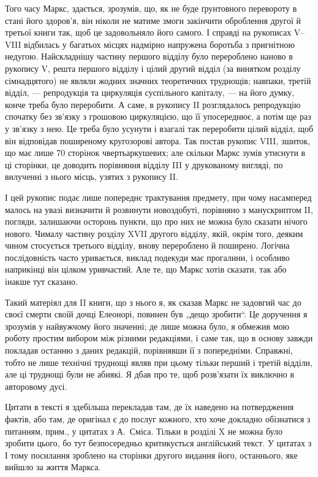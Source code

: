 Того часу Маркс, здається, зрозумів, що, як не буде ґрунтовного перевороту
в стані його здоров’я, він ніколи не матиме змоги закінчити оброблення
другої й третьої книги так, щоб це задовольняло його самого. І справді
на рукописах V--VIII відбилась у багатьох місцях надмірно напружена
боротьба з пригнітною недугою. Найскладнішу частину першого відділу
було перероблено наново в рукопису V, решта першого відділу і цілий
другий відділ (за винятком розділу сімнадцятого) не являли жодних
значних теоретичних труднощів; навпаки, третій відділ, — репродукція
та циркуляція суспільного капіталу, — на його думку, конче треба
було переробити. А саме, в рукопису II розглядалось репродукцію
спочатку без зв’язку з грошовою циркуляцією, що її упосереднює, а потім
ще раз у зв’язку з нею. Це треба було усунути і взагалі так переробити
цілий відділ, щоб він відповідав поширеному кругозорові автора.
Так постав рукопис VIII, зшиток, що має лише 70 сторінок чвертьаркушевих;
але скільки Маркс зумів утиснути в ці сторінки, це доводить
порівняння відділу III у друкованому вигляді, по вилученні з нього
місць, узятих з рукопису II.

І цей рукопис подає лише попереднє трактування предмету, при чому
насамперед малось на увазі визначити й розвинути новоздобуті, порівняно
з манускриптом II, погляди, залишаючи осторонь пункти, що про них
не можна було сказати нічого нового. Чималу частину розділу XVII
другого відділу, якій, окрім того, деяким чином стосується третього відділу,
внову перероблено й поширено. Логічна послідовність часто уривається,
виклад подекуди має прогалини, і особливо наприкінці він цілком
уривчастий. Але те, що Маркс хотів сказати, так або інакше тут сказано.

Такий матеріял для II книги, що з нього я, як сказав Маркс не задовгий
час до своєї смерти своїй дочці Елеонорі, повинен був „дещо зробити“.
Це доручення я зрозумів у найвужчому його значенні; де лише
можна було, я обмежив мою роботу простим вибором між різними редакціями,
і саме так, що в основу завжди покладав останню з даних редакцій,
порівнявши її з попередніми. Справжні, тобто не лише технічні
труднощі являв при цьому тільки перший і третій відділи, але ці труднощі
були не абиякі. Я дбав про те, щоб розв’язати їх виключно в
авторовому дусі.

Цитати в тексті я здебільша перекладав там, де їх наведено на потвердження
фактів, або там, де оригінал є до послуг кожного, хто хоче
докладно обізнатися з питанням, прим., у цитатах з А.~Сміса. Тільки в
розділі X не можна було зробити цього, бо тут безпосередньо критикується
англійський текст. У цитатах з І тому посилання зроблено на
сторінки другого видання його, останнього, яке вийшло за життя
Маркса.

